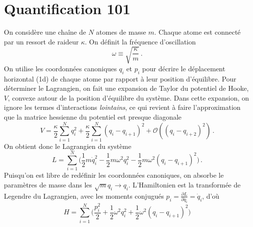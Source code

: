 \documentclass{article}
\numberwithin{equation}{section}
\theoremstyle{solution}
\begin{document}
\section{Quantification 101}
On considère une chaîne de $N$ atomes de masse $m$. Chaque atome est connecté par un ressort de raideur $\kappa$. 
On définit la fréquence d'oscillation
\begin{equation}
        \omega \equiv \sqrt{\frac{\kappa}{m}}\, .
\end{equation} 
On utilise les coordonnées canoniques $q_i$ et $p_i$ pour décrire le déplacement horizontal (1d) de chaque atome par rapport à leur position d'équilibre. 
Pour déterminer le Lagrangien, on fait une expansion de Taylor du potentiel de Hooke, $V$, convexe autour de la position d'équilibre du système. Dans cette expansion, 
on ignore les termes d'interactions \textit{lointains}, ce qui revient à faire l'approximation que la matrice hessienne du potentiel est presque diagonale
\begin{equation}\label{eq:Hooke Pot}
        V = \frac{\kappa}{2}\sum_{i=1}^Nq_i^2 + \frac{\kappa}{2}\sum_{i=1}^N (q_i - q_{i+1})^2 +\mathcal{O}((q_i - q_{i+2})^{2})\, .
\end{equation} 
On obtient donc le Lagrangien du système
\begin{equation}
        L = \sum_{i=1}^{N}\bigg(\frac{1}{2}m\dot{q}_i^2 - \frac{1}{2}m\omega^{2}q_i^2- \frac{1}{2}m\omega^2(q_i - q_{i+1})^2\bigg)\, .
\end{equation} 
Puisqu'on est libre de redéfinir les coordonnées canoniques, on absorbe le paramètres de masse dans les $\sqrt{m}q_i \rightarrow q_i$.
L'Hamiltonien est la transformée de Legendre du Lagrangien, avec les moments conjugués $p_i = \frac{\partial L}{\partial \dot{q}_i} = \dot{q}_i$, d'où
\begin{equation}
        H = \sum_{i=1}^N \bigg(\frac{p_i^2}{2} + \frac{1}{2}\omega^{2}q_i^2 + \frac{1}{2}\omega^2(q_i - q_{i+1})^2\bigg)
\end{equation} 
\end{document}
